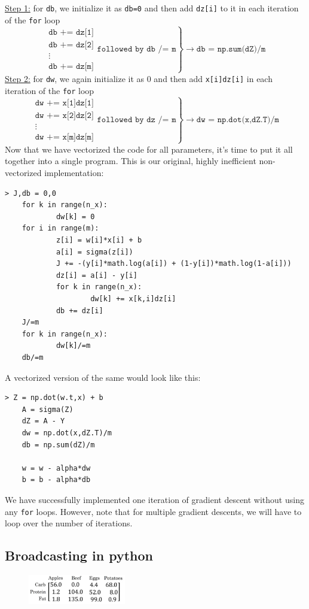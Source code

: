 \documentclass{article}[a4paper,12pt]
\theoremstyle{definition}
\begin{document}
\underline{Step 1:} for \texttt{db}, we initialize it as \texttt{db=0} and then add \texttt{dz[i]} to it in each iteration of the \texttt{for} loop
$$\left. \begin{array}{cc}
    \texttt{db += dz[1]} \\
    \texttt{db += dz[2]} \\
    \vdots \\
    \texttt{db += dz[m]}
\end{array}{} \texttt{followed by db /= m} \right\}
\longrightarrow \texttt{db = np.sum(dZ)/m}$$
\underline{Step 2:} for \texttt{dw}, we again initialize it as 0 and then add \texttt{x[i]dz[i]} in each iteration of the \texttt{for} loop
$$\left. \begin{array}{cc}
    \texttt{dw += x[1]dz[1]} \\
    \texttt{dw += x[2]dz[2]} \\
    \vdots \\
    \texttt{dw += x[m]dz[m]}
\end{array}{} \texttt{followed by dz /= m} \right\}
\longrightarrow \texttt{dw = np.dot(x,dZ.T)/m}$$
Now that we have vectorized the code for all parameters, it's time to put it all together into a single program. This is our original, highly inefficient non-vectorized implementation:
\begin{Verbatim}[tabsize=2]
> J,db = 0,0
	for k in range(n_x):
			dw[k] = 0
	for i in range(m):
			z[i] = w[i]*x[i] + b
			a[i] = sigma(z[i])
			J += -(y[i]*math.log(a[i]) + (1-y[i])*math.log(1-a[i]))
			dz[i] = a[i] - y[i]
			for k in range(n_x):
					dw[k] += x[k,i]dz[i]
			db += dz[i]
	J/=m
	for k in range(n_x):
			dw[k]/=m
	db/=m
\end{Verbatim}
A vectorized version of the same would look like this:
\begin{Verbatim}[tabsize=2]
> Z = np.dot(w.t,x) + b
	A = sigma(Z)
	dZ = A - Y
	dw = np.dot(x,dZ.T)/m
	db = np.sum(dZ)/m
	
	w = w - alpha*dw
	b = b - alpha*db
\end{Verbatim}
We have successfully implemented one iteration of gradient descent without using any \texttt{for} loops. However, note that for multiple gradient descents, we will have to loop over the number of iterations.
\subsection{Broadcasting in python}
\begin{figure}
\centering \includegraphics[width=0.38\textwidth]{broadcasting_example.png}
\end{figure}
\vspace{6pt}
\end{document}
